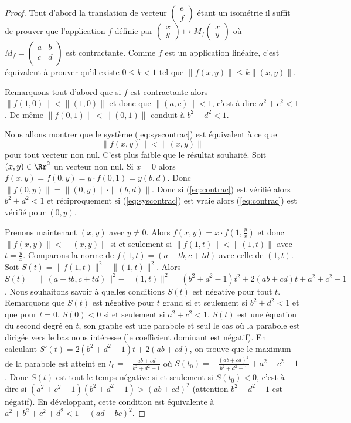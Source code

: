 \documentclass[11pt,class=report,crop=false]{standalone}
\newcommand{\myvec}[2]{\begin{pmatrix}#1 \\ #2\end{pmatrix}}
\begin{document}
\begin{proof}
Tout d'abord la translation de vecteur $\myvec{e}{f}$ étant un isométrie il suffit de prouver
que l'application $f$ définie par 
 $\myvec{x}{y} \mapsto M_f
\myvec{x}{y}$ où $M_f= \begin{pmatrix}a & b \\ c & d \\  \end{pmatrix}$
est contractante. Comme $f$ est un application linéaire, c'est équivalent à prouver qu'il existe
$0 \le k < 1$ tel que
$\|f(x,y)\| \le k \|(x,y) \|$.

\bigskip

Remarquons tout d'abord que si $f$ est contractante alors
$\|f(1,0)\| < \|(1,0)\|$ et donc que $\|(a,c)\| < 1$, c'est-à-dire $a^2+c^2<1$.
De même $\|f(0,1)\| < \|(0,1)\|$ conduit à $b^2+d^2<1$.



Nous allons montrer que le système (\ref{eq:syscontrac}) est équivalent à ce que 
\begin{equation}
\label{eq:contrac}
\|f(x,y)\| < \|(x,y) \|
\end{equation}
pour tout vecteur non nul. C'est plus faible que le résultat souhaité.
Soit $(x,y) \in \Rr^2$ un vecteur non nul. Si $x=0$ alors 
$f(x,y)=f(0,y)=y\cdot f(0,1)=y(b,d)$. Donc $\|f(0,y)\| = \|(0,y)\|\cdot \|(b,d)\|$.
Donc si (\ref{eq:contrac}) est vérifié alors $b^2+d^2<1$ et réciproquement si (\ref{eq:syscontrac}) est vraie
alors (\ref{eq:contrac}) est vérifié pour $(0,y)$.

Prenons maintenant $(x,y)$ avec $y\neq 0$. Alors $f(x,y)=x \cdot f(1,\frac yx)$ et donc 
$\|f(x,y)\| < \|(x,y) \|$  si et seulement si $\|f(1,t)\| < \|(1,t) \|$ avec $t = \frac yx$.
Comparons la norme de $f(1,t)=(a+tb,c+td)$ avec celle de $(1,t)$.
Soit $S(t)= \|f(1,t) \|^2 - \| (1,t)\|^2$. Alors 
$S(t)=\|(a+tb,c+td) \|^2 - \| (1,t)\|^2 = (b^2+d^2-1)t^2+2(ab+cd)t+a^2+c^2-1$.
Nous souhaitons savoir à quelles conditions $S(t)$ est négative pour tout $t$.
Remarquons que $S(t)$ est négative pour $t$ grand si et seulement si
$b^2+d^2 < 1$ et que pour $t=0$,  $S(0)<0$ si et seulement si $a^2+c^2<1$.
$S(t)$ est une équation du second degré en $t$, son graphe est une parabole et
seul le cas où la parabole est dirigée vers le bas nous intéresse (le coefficient dominant est négatif).
En calculant $S'(t)= 2(b^2+d^2-1)t+2(ab+cd)$, on trouve que le maximum de la parabole est atteint en 
$t_0= -\frac{ab+cd}{b^2+d^2-1}$ où $S(t_0)= -\frac{(ab+cd)^2}{b^2+d^2-1}+a^2+c^2-1$.
Donc $S(t)$ est tout le temps négative si et seulement si $S(t_0)<0$,
c'est-à-dire si $(a^2+c^2-1)(b^2+d^2-1) > (ab+cd)^2$ (attention $b^2+d^2-1$ est négatif).
En développant, cette condition est équivalente à
$a^2+b^2+c^2+d^2 < 1 - (ad-bc)^2$.


\end{proof}
\end{document}
